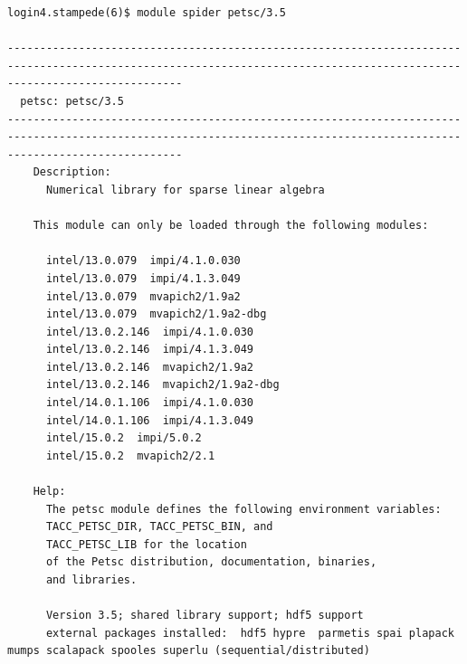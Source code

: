 \documentclass{article}
\begin{document}
\begin{verbatim}
login4.stampede(6)$ module spider petsc/3.5

-----------------------------------------------------------------------------------------------------------------------------------------------------------------------
  petsc: petsc/3.5
-----------------------------------------------------------------------------------------------------------------------------------------------------------------------
    Description:
      Numerical library for sparse linear algebra

    This module can only be loaded through the following modules:

      intel/13.0.079  impi/4.1.0.030
      intel/13.0.079  impi/4.1.3.049
      intel/13.0.079  mvapich2/1.9a2
      intel/13.0.079  mvapich2/1.9a2-dbg
      intel/13.0.2.146  impi/4.1.0.030
      intel/13.0.2.146  impi/4.1.3.049
      intel/13.0.2.146  mvapich2/1.9a2
      intel/13.0.2.146  mvapich2/1.9a2-dbg
      intel/14.0.1.106  impi/4.1.0.030
      intel/14.0.1.106  impi/4.1.3.049
      intel/15.0.2  impi/5.0.2
      intel/15.0.2  mvapich2/2.1
 
    Help:
      The petsc module defines the following environment variables:
      TACC_PETSC_DIR, TACC_PETSC_BIN, and
      TACC_PETSC_LIB for the location
      of the Petsc distribution, documentation, binaries,
      and libraries.
      
      Version 3.5; shared library support; hdf5 support
      external packages installed:  hdf5 hypre  parmetis spai plapack mumps scalapack spooles superlu (sequential/distributed)
\end{verbatim}
\normalsize
 \scriptsize
\end{document}
